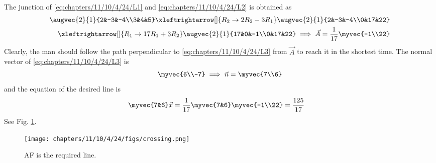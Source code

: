 The junction of \eqref{eq:chapters/11/10/4/24/L1}
    and \eqref{eq:chapters/11/10/4/24/L2} is obtained as
    \begin{align*}
	    \augvec{2}{1}{2&-3&-4\\3&4&5} \xleftrightarrow[]{R_2\rightarrow2R_2-3R_1} 
        \augvec{2}{1}{2&-3&-4\\0&17&22} \\
		      \xleftrightarrow[]{R_1\rightarrow17R_1+3R_2} \augvec{2}{1}{17&0&-1\\0&17&22} 
		      \implies
        \vec{A} = \frac{1}{17}\myvec{-1\\22}
    \end{align*}
    Clearly, the man should follow the path perpendicular to \eqref{eq:chapters/11/10/4/24/L3} from
    $\vec{A}$ to reach it in the shortest time. The normal vector 
    of \eqref{eq:chapters/11/10/4/24/L3} is 
    \begin{align}
         \myvec{6\\-7}
	 \implies
        \vec{n} = \myvec{7\\6}
        \label{eq:chapters/11/10/4/24/L4-norm}
    \end{align}
    and the equation of the desired line is
   \begin{align}
        \myvec{7&6}\vec{x} &= \frac{1}{17}\myvec{7&6}\myvec{-1\\22} = \frac{125}{17}
        \label{eq:chapters/11/10/4/24/L4}
    \end{align}
		See Fig. \ref{fig:chapters/11/10/4/24/crossing}.
		\begin{figure}[H]
        \centering
        \texttt{[image: chapters/11/10/4/24/figs/crossing.png]}
        \caption{AF is the required line.}
        \label{fig:chapters/11/10/4/24/crossing}
    \end{figure}

